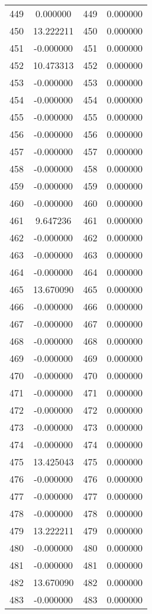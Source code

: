 \documentclass[12pt]{article}
\begin{document}
\begin{longtable}{@{}cccc@{}}
449 & 0.000000 & 449 & 0.000000 \\
450 & 13.222211 & 450 & 0.000000 \\
451 & -0.000000 & 451 & 0.000000 \\
452 & 10.473313 & 452 & 0.000000 \\
453 & -0.000000 & 453 & 0.000000 \\
454 & -0.000000 & 454 & 0.000000 \\
455 & -0.000000 & 455 & 0.000000 \\
456 & -0.000000 & 456 & 0.000000 \\
457 & -0.000000 & 457 & 0.000000 \\
458 & -0.000000 & 458 & 0.000000 \\
459 & -0.000000 & 459 & 0.000000 \\
460 & -0.000000 & 460 & 0.000000 \\
461 & 9.647236 & 461 & 0.000000 \\
462 & -0.000000 & 462 & 0.000000 \\
463 & -0.000000 & 463 & 0.000000 \\
464 & -0.000000 & 464 & 0.000000 \\
465 & 13.670090 & 465 & 0.000000 \\
466 & -0.000000 & 466 & 0.000000 \\
467 & -0.000000 & 467 & 0.000000 \\
468 & -0.000000 & 468 & 0.000000 \\
469 & -0.000000 & 469 & 0.000000 \\
470 & -0.000000 & 470 & 0.000000 \\
471 & -0.000000 & 471 & 0.000000 \\
472 & -0.000000 & 472 & 0.000000 \\
473 & -0.000000 & 473 & 0.000000 \\
474 & -0.000000 & 474 & 0.000000 \\
475 & 13.425043 & 475 & 0.000000 \\
476 & -0.000000 & 476 & 0.000000 \\
477 & -0.000000 & 477 & 0.000000 \\
478 & -0.000000 & 478 & 0.000000 \\
479 & 13.222211 & 479 & 0.000000 \\
480 & -0.000000 & 480 & 0.000000 \\
481 & -0.000000 & 481 & 0.000000 \\
482 & 13.670090 & 482 & 0.000000 \\
483 & -0.000000 & 483 & 0.000000 \\

\end{longtable}
\end{document}
